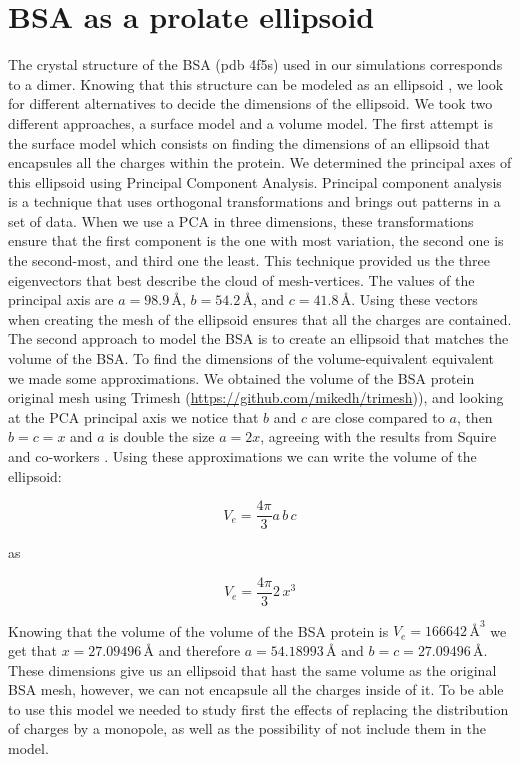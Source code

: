 \section{BSA as a prolate ellipsoid}

The crystal structure of the BSA (pdb 4f5s) used in our simulations corresponds
to a dimer. Knowing that this structure can be modeled as an ellipsoid \cite{SquireETal1968},
we look for different alternatives to decide the dimensions of the ellipsoid. We took two
different approaches, a surface model and a volume model. The first attempt is 
the surface model which consists on finding the dimensions
of an ellipsoid that encapsules all the charges within the protein. We determined the principal axes of this
ellipsoid using Principal Component Analysis. Principal component analysis is a technique that
uses orthogonal transformations and brings out patterns in a set of data. When 
we use a PCA in three dimensions, these transformations ensure that the first 
component is the one with most variation, the second one is the second-most, and
third one the least. This technique provided us the three eigenvectors that best 
describe the cloud of mesh-vertices. The values of the principal axis are $a=98.9\, \text{\AA}$, $b=54.2\, \text{\AA}$, and $c=41.8\, \text{\AA}$. 
Using these vectors when creating the mesh of the ellipsoid ensures that all the charges are contained.
The second approach to model the BSA is to create an ellipsoid that matches the volume of the BSA. To find the dimensions 
of the volume-equivalent equivalent we made some approximations. We obtained the volume of the BSA protein original mesh
using Trimesh (\url{https://github.com/mikedh/trimesh})), and looking at the PCA principal axis we notice that $b$ and $c$ are close 
compared to $a$, then $b=c=x$ and $a$ is double the size $a=2x$, agreeing with the results from Squire and co-workers
\cite{SquireETal1968}. Using these approximations we can write the volume of the ellipsoid:

\begin{equation}
    V_e = \frac{4\pi}{3}a\,b\,c 
\end{equation}

as 

\begin{equation}
    V_e = \frac{4\pi}{3}2\,x^3
\end{equation}

Knowing that the volume of the volume of the BSA protein is $V_e = 166642 \, \text{\AA}^3$ we get that $x=27.09496 \, \text{\AA}$ 
and therefore $a=54.18993 \, \text{\AA}$ and $b=c=27.09496 \, \text{\AA}$. These dimensions give us an ellipsoid that hast the same volume 
as the original BSA mesh, however, we can not encapsule all the charges inside of it. To be able to use this model we needed to study first the 
effects of replacing the distribution of charges by a monopole, as well as the possibility of not include them in the model. 

